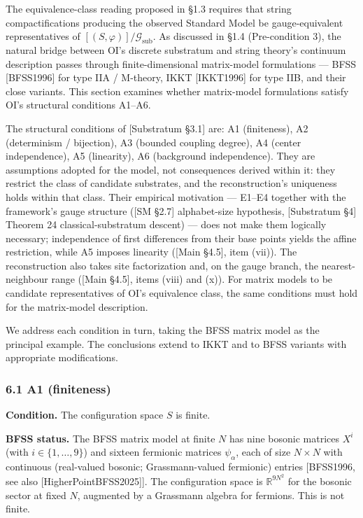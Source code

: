 \documentclass[
]{article}
\begin{document}
The equivalence-class reading proposed in §1.3 requires that string
compactifications producing the observed Standard Model be
gauge-equivalent representatives of
\([(S, \varphi)]/\mathcal{G}_{\text{sub}}\). As discussed in §1.4
(Pre-condition 3), the natural bridge between OI's discrete substratum
and string theory's continuum description passes through
finite-dimensional matrix-model formulations --- BFSS {[}BFSS1996{]} for
type IIA / M-theory, IKKT {[}IKKT1996{]} for type IIB, and their close
variants. This section examines whether matrix-model formulations
satisfy OI's structural conditions A1--A6.

The structural conditions of {[}Substratum §3.1{]} are: A1 (finiteness),
A2 (determinism / bijection), A3 (bounded coupling degree), A4 (center
independence), A5 (linearity), A6 (background independence). They are
assumptions adopted for the model, not consequences derived within it:
they restrict the class of candidate substrates, and the
reconstruction's uniqueness holds within that class. Their empirical
motivation --- E1--E4 together with the framework's gauge structure
({[}SM §2.7{]} alphabet-size hypothesis, {[}Substratum §4{]} Theorem 24
classical-substratum descent) --- does not make them logically
necessary; independence of first differences from their base points
yields the affine restriction, while A5 imposes linearity ({[}Main
§4.5{]}, item (vii)). The reconstruction also takes site factorization
and, on the gauge branch, the nearest-neighbour range ({[}Main §4.5{]},
items (viii) and (x)). For matrix models to be candidate representatives
of OI's equivalence class, the same conditions must hold for the
matrix-model description.

We address each condition in turn, taking the BFSS matrix model as the
principal example. The conclusions extend to IKKT and to BFSS variants
with appropriate modifications.

\hypertarget{a1-finiteness}{%
\subsubsection{6.1 A1 (finiteness)}\label{a1-finiteness}}

\textbf{Condition.} The configuration space \(S\) is finite.

\textbf{BFSS status.} The BFSS matrix model at finite \(N\) has nine
bosonic matrices \(X^i\) (with \(i \in \{1, \ldots, 9\}\)) and sixteen
fermionic matrices \(\psi_\alpha\), each of size \(N \times N\) with
continuous (real-valued bosonic; Grassmann-valued fermionic) entries
{[}BFSS1996, see also {[}HigherPointBFSS2025{]}{]}. The configuration
space is \(\mathbb{R}^{9N^2}\) for the bosonic sector at fixed \(N\),
augmented by a Grassmann algebra for fermions. This is not finite.
\end{document}
